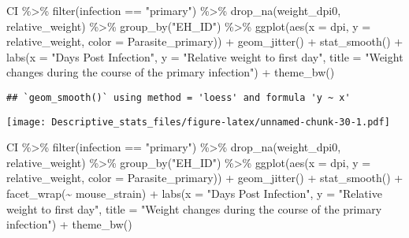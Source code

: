 \documentclass[
]{article}
\newenvironment{Shaded}{\begin{snugshade}}{\end{snugshade}}
\newcommand{\AttributeTok}[1]{\textcolor[rgb]{0.77,0.63,0.00}{#1}}
\newcommand{\FunctionTok}[1]{\textcolor[rgb]{0.00,0.00,0.00}{#1}}
\newcommand{\NormalTok}[1]{#1}
\newcommand{\SpecialCharTok}[1]{\textcolor[rgb]{0.00,0.00,0.00}{#1}}
\newcommand{\StringTok}[1]{\textcolor[rgb]{0.31,0.60,0.02}{#1}}
\begin{document}
\begin{Shaded}
\begin{Highlighting}[]
\NormalTok{CI }\SpecialCharTok{\%\textgreater{}\%} 
    \FunctionTok{filter}\NormalTok{(infection }\SpecialCharTok{==} \StringTok{"primary"}\NormalTok{) }\SpecialCharTok{\%\textgreater{}\%}
    \FunctionTok{drop\_na}\NormalTok{(weight\_dpi0, relative\_weight) }\SpecialCharTok{\%\textgreater{}\%}
    \FunctionTok{group\_by}\NormalTok{(}\StringTok{"EH\_ID"}\NormalTok{) }\SpecialCharTok{\%\textgreater{}\%}
    \FunctionTok{ggplot}\NormalTok{(}\FunctionTok{aes}\NormalTok{(}\AttributeTok{x =}\NormalTok{ dpi, }\AttributeTok{y =}\NormalTok{ relative\_weight, }\AttributeTok{color =}\NormalTok{ Parasite\_primary)) }\SpecialCharTok{+}
    \FunctionTok{geom\_jitter}\NormalTok{() }\SpecialCharTok{+}
    \FunctionTok{stat\_smooth}\NormalTok{() }\SpecialCharTok{+}
    \FunctionTok{labs}\NormalTok{(}\AttributeTok{x =} \StringTok{"Days Post Infection"}\NormalTok{, }\AttributeTok{y =} \StringTok{"Relative weight to first day"}\NormalTok{,}
         \AttributeTok{title =} \StringTok{"Weight changes during the course of the primary infection"}\NormalTok{) }\SpecialCharTok{+}
    \FunctionTok{theme\_bw}\NormalTok{()}
\end{Highlighting}
\end{Shaded}

\begin{verbatim}
## `geom_smooth()` using method = 'loess' and formula 'y ~ x'
\end{verbatim}

\texttt{[image: Descriptive\_stats\_files/figure-latex/unnamed-chunk-30-1.pdf]}

\begin{Shaded}
\begin{Highlighting}[]
\NormalTok{CI }\SpecialCharTok{\%\textgreater{}\%} 
    \FunctionTok{filter}\NormalTok{(infection }\SpecialCharTok{==} \StringTok{"primary"}\NormalTok{) }\SpecialCharTok{\%\textgreater{}\%}
    \FunctionTok{drop\_na}\NormalTok{(weight\_dpi0, relative\_weight) }\SpecialCharTok{\%\textgreater{}\%}
    \FunctionTok{group\_by}\NormalTok{(}\StringTok{"EH\_ID"}\NormalTok{) }\SpecialCharTok{\%\textgreater{}\%}
    \FunctionTok{ggplot}\NormalTok{(}\FunctionTok{aes}\NormalTok{(}\AttributeTok{x =}\NormalTok{ dpi, }\AttributeTok{y =}\NormalTok{ relative\_weight, }\AttributeTok{color =}\NormalTok{ Parasite\_primary)) }\SpecialCharTok{+}
    \FunctionTok{geom\_jitter}\NormalTok{() }\SpecialCharTok{+}
    \FunctionTok{stat\_smooth}\NormalTok{() }\SpecialCharTok{+}
    \FunctionTok{facet\_wrap}\NormalTok{(}\SpecialCharTok{\textasciitilde{}}\NormalTok{ mouse\_strain) }\SpecialCharTok{+}
    \FunctionTok{labs}\NormalTok{(}\AttributeTok{x =} \StringTok{"Days Post Infection"}\NormalTok{, }\AttributeTok{y =} \StringTok{"Relative weight to first day"}\NormalTok{,}
         \AttributeTok{title =} \StringTok{"Weight changes during the course of the primary infection"}\NormalTok{) }\SpecialCharTok{+}
    \FunctionTok{theme\_bw}\NormalTok{()}
\end{Highlighting}
\end{Shaded}
\end{document}
